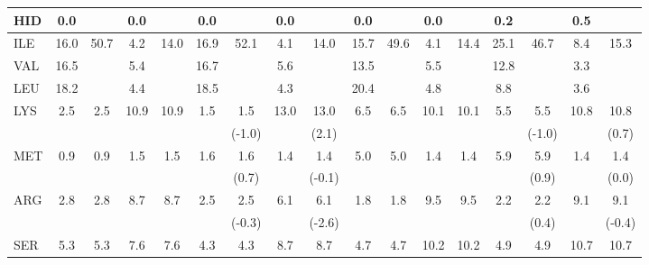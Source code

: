 \begin{table}
{\begin{tabular}{lcccc|cccc|cccc|cccc}
HID&0.0&&0.0&&0.0&&0.0&&0.0&&0.0&&0.2&&0.5&\\
\hline                                                                                  
ILE&16.0&\multirow{3}{*}{50.7}&4.2&\multirow{3}{*}{14.0}&16.9&\multirow{2}{*}{52.1}&4.1&\multirow{2}{*}{14.0}&15.7&\multirow{3}{*}{49.6}&4.1&\multirow{3}{*}{14.4}&25.1&\multirow{2}{*}{46.7}&8.4&\multirow{2}{*}{15.3}\\
VAL&16.5&&5.4&&16.7&\multirow{2}{*}{(1.4)}&5.6&\multirow{2}{*}{(0.0)}&13.5&&5.5&&12.8&\multirow{2}{*}{(-2.9)}&3.3&\multirow{2}{*}{(0.9)}\\
LEU&18.2&&4.4&&18.5&&4.3&&20.4&&4.8&&8.8&&3.6&\\
\hline                                                                              
\multirow{2}{*}{LYS}&\multirow{2}{*}{2.5}&\multirow{2}{*}{2.5}&\multirow{2}{*}{10.9}&\multirow{2}{*}{10.9}&\multirow{2}{*}{1.5}&1.5&\multirow{2}{*}{13.0}&13.0&\multirow{2}{*}{6.5}&\multirow{2}{*}{6.5}&\multirow{2}{*}{10.1}&\multirow{2}{*}{10.1}&\multirow{2}{*}{5.5}&5.5&\multirow{2}{*}{10.8}&10.8\\
&&&&&&(-1.0)&&(2.1)&&&&&&(-1.0)&&(0.7)\\
\hline                                                                        
\multirow{2}{*}{MET}&\multirow{2}{*}{0.9}&\multirow{2}{*}{0.9}&\multirow{2}{*}{1.5}&\multirow{2}{*}{1.5}&\multirow{2}{*}{1.6}&1.6&\multirow{2}{*}{1.4}&1.4&\multirow{2}{*}{5.0}&\multirow{2}{*}{5.0}&\multirow{2}{*}{1.4}&\multirow{2}{*}{1.4}&\multirow{2}{*}{5.9}&5.9&\multirow{2}{*}{1.4}&1.4\\
&&&&&&(0.7)&&(-0.1)&&&&&&(0.9)&&(0.0)\\
\hline                                                                         
\multirow{2}{*}{ARG}&\multirow{2}{*}{2.8}&\multirow{2}{*}{2.8}&\multirow{2}{*}{8.7}&\multirow{2}{*}{8.7}&\multirow{2}{*}{2.5}&2.5&\multirow{2}{*}{6.1}&6.1&\multirow{2}{*}{1.8}&\multirow{2}{*}{1.8}&\multirow{2}{*}{9.5}&\multirow{2}{*}{9.5}&\multirow{2}{*}{2.2}&2.2&\multirow{2}{*}{9.1}&9.1\\
&&&&&&(-0.3)&&(-2.6)&&&&&&(0.4)&&(-0.4)\\
\hline                                                                                  
\multirow{2}{*}{SER} &\multirow{2}{*}{5.3}&\multirow{2}{*}{5.3}&\multirow{2}{*}{7.6}&\multirow{2}{*}{7.6}&\multirow{2}{*}{4.3}&4.3&\multirow{2}{*}{8.7}&8.7&\multirow{2}{*}{4.7}&\multirow{2}{*}{4.7}&\multirow{2}{*}{10.2}&\multirow{2}{*}{10.2}&\multirow{2}{*}{4.9}&4.9&\multirow{2}{*}{10.7}&10.7\\

\end{tabular}}
\end{table}
